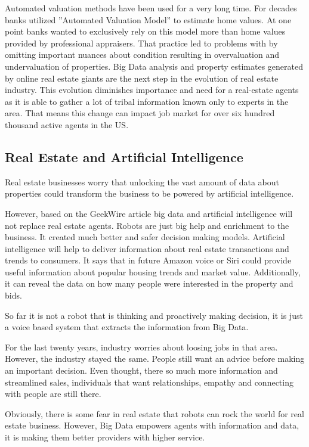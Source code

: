 \documentclass[sigconf]{acmart}
\begin{document}
Automated valuation methods have been used for a very long time. For decades banks utilized ''Automated Valuation Model'' to estimate home values. At one point banks wanted to exclusively rely on this model more than home values provided by professional appraisers. That practice led to problems with by omitting important nuances about condition resulting in overvaluation and undervaluation of properties. Big Data analysis and property estimates generated by online real estate giants are the next step in the evolution of real estate industry. This evolution diminishes importance and need for a real-estate agents as it is able to gather a lot of tribal information known only to experts in the area. That means this change can impact job market for over six hundred thousand active agents in the US.

\subsection{Real Estate and Artificial Intelligence}

Real estate businesses worry that unlocking the vast amount of data about properties could transform the business to be powered by artificial intelligence.   

However, based on the GeekWire article \cite{robots} big data and artificial intelligence will not replace real estate agents. Robots are just big help and enrichment to the business. It created much better and safer decision making models. Artificial intelligence will help to deliver information about real estate transactions and trends to consumers. 
It says that in future Amazon voice or Siri could provide useful information about popular housing trends and market value. Additionally, it can reveal the data on how many people were interested in the property and bids. 

So far it is not a robot that is thinking and proactively making decision, it is just a voice based system that extracts the information from Big Data. 

For the last twenty years, industry worries about loosing jobs in that area. However, the industry stayed the same.
People still want an advice before making an important decision. Even thought, there so much more information and streamlined sales, individuals that want relationships, empathy and connecting with people are still there.

Obviously, there is some fear in real estate that robots can rock the world for real estate business. However, Big Data empowers agents with information and data, it is making them better providers with higher service. 
\end{document}
